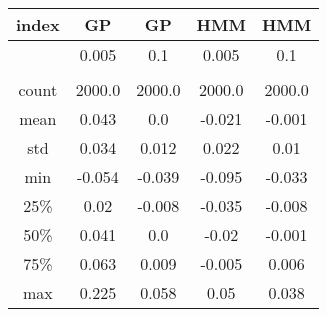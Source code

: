 \centering \begin{tabular}{c|c|c|c|c}
index	&GP	&GP	&HMM	&HMM\\\hline
	&0.005	&0.1	&0.005	&0.1\\
	&	&	&	&\\
count	&2000.0	&2000.0	&2000.0	&2000.0\\
mean	&0.043	&0.0	&-0.021	&-0.001\\
std	&0.034	&0.012	&0.022	&0.01\\
min	&-0.054	&-0.039	&-0.095	&-0.033\\
25\%	&0.02	&-0.008	&-0.035	&-0.008\\
50\%	&0.041	&0.0	&-0.02	&-0.001\\
75\%	&0.063	&0.009	&-0.005	&0.006\\
max	&0.225	&0.058	&0.05	&0.038\\
\end{tabular}
